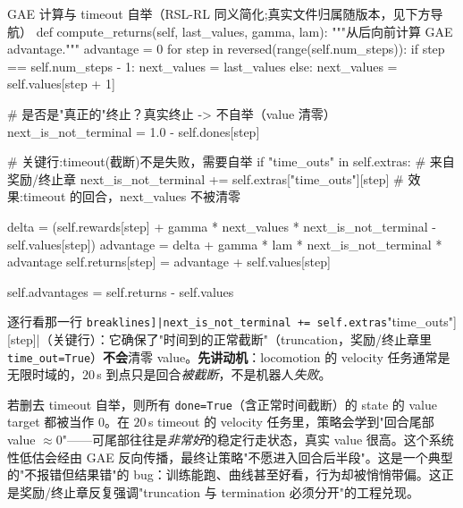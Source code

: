 \begin{codebox}[Python]{GAE 计算与 timeout 自举（RSL-RL 同义简化;真实文件归属随版本，见下方导航）}
def compute_returns(self, last_values, gamma, lam):
    """从后向前计算 GAE advantage."""
    advantage = 0
    for step in reversed(range(self.num_steps)):
        if step == self.num_steps - 1:
            next_values = last_values
        else:
            next_values = self.values[step + 1]

        # 是否是"真正的"终止？真实终止 -> 不自举（value 清零）
        next_is_not_terminal = 1.0 - self.dones[step]

        # 关键行:timeout(截断)不是失败，需要自举
        if "time_outs" in self.extras:                       # 来自奖励/终止章
            next_is_not_terminal += self.extras["time_outs"][step]
            # 效果:timeout 的回合，next_values 不被清零

        delta = (self.rewards[step]
                 + gamma * next_values * next_is_not_terminal
                 - self.values[step])
        advantage = delta + gamma * lam * next_is_not_terminal * advantage
        self.returns[step] = advantage + self.values[step]

    self.advantages = self.returns - self.values
\end{codebox}

逐行看那一行 \Verb[breaklines]|next_is_not_terminal += self.extras["time_outs"][step]|（关键行）：它确保了"时间到的正常截断"（truncation，奖励/终止章里 \verb|time_out=True|）\textbf{不会}清零 value。\textbf{先讲动机}：locomotion 的 velocity 任务通常是无限时域的，$20\,$s 到点只是回合\emph{被截断}，不是机器人\emph{失败}。

\begin{derivation}
若删去 timeout 自举，则所有 \verb|done=True|（含正常时间截断）的 state 的 value target 都被当作 $0$。在 $20\,$s timeout 的 velocity 任务里，策略会学到"回合尾部 value $\approx0$"——可尾部往往是\emph{非常好}的稳定行走状态，真实 value 很高。这个系统性低估会经由 GAE 反向传播，最终让策略"不愿进入回合后半段"。这是一个典型的"不报错但结果错"的 bug：训练能跑、曲线甚至好看，行为却被悄悄带偏。这正是奖励/终止章反复强调"truncation 与 termination 必须分开"的工程兑现。
\end{derivation}


